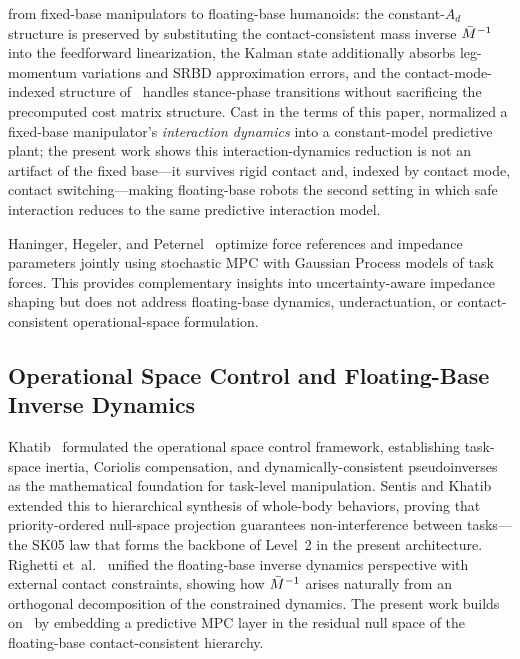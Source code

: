 from fixed-base manipulators to floating-base humanoids: the constant-$A_d$
structure is preserved by substituting the contact-consistent mass inverse
$\bar{M}^{-1}$ into the feedforward linearization, the Kalman state additionally
absorbs leg-momentum variations and SRBD approximation errors, and the
contact-mode-indexed structure of~\cite{cao2005minmax} handles stance-phase
transitions without sacrificing the precomputed cost matrix structure.
Cast in the terms of this paper, \cite{cao2026impedance} normalized a
fixed-base manipulator's \emph{interaction dynamics} into a constant-model
predictive plant; the present work shows this interaction-dynamics reduction
is not an artifact of the fixed base---it survives rigid contact and, indexed
by contact mode, contact switching---making floating-base robots the second
setting in which safe interaction reduces to the same predictive interaction
model.

Haninger, Hegeler, and Peternel~\cite{haninger2022model} optimize force
references and impedance parameters jointly using stochastic MPC with
Gaussian Process models of task forces.
This provides complementary insights into uncertainty-aware impedance
shaping but does not address floating-base dynamics, underactuation, or
contact-consistent operational-space formulation.

\subsection{Operational Space Control and Floating-Base Inverse Dynamics}

Khatib~\cite{khatib1987unified} formulated the operational space control
framework, establishing task-space inertia, Coriolis compensation, and
dynamically-consistent pseudoinverses as the mathematical foundation for
task-level manipulation.
Sentis and Khatib~\cite{sentis2005synthesis} extended this to hierarchical
synthesis of whole-body behaviors, proving that priority-ordered null-space
projection guarantees non-interference between tasks---the SK05 law that
forms the backbone of Level~2 in the present architecture.
Righetti et~al.~\cite{righetti2011inverse} unified the floating-base
inverse dynamics perspective with external contact constraints, showing how
$\bar{M}^{-1}$ arises naturally from an orthogonal decomposition of the constrained
dynamics.
The present work builds on~\cite{khatib1987unified,sentis2005synthesis,righetti2011inverse}
by embedding a predictive MPC layer in the residual null space of the
floating-base contact-consistent hierarchy.

